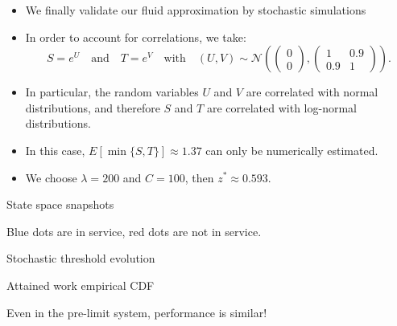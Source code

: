 \documentclass[aspectratio=169]{beamer}
\begin{document}
\begin{frame}
	\begin{itemize}
	\item We finally validate our fluid approximation by stochastic simulations
	\item In order to account for correlations, we take:
	 \begin{equation*}
    S = e^U \quad \text{and} \quad T = e^V \quad \text{with} \quad (U, V) \sim \mathcal{N}\left(\begin{pmatrix}
    0 \\ 0
    \end{pmatrix}, \begin{pmatrix}
    1 & 0.9 \\ 0.9 & 1
    \end{pmatrix}\right).
\end{equation*}
    \item In particular, the random variables $U$ and $V$ are correlated with normal distributions, and therefore $S$ and $T$ are correlated with log-normal distributions.
	\item In this case, $E[\min\{S,T\}] \approx 1.37$ can only be numerically estimated. 
	\item We choose $\lambda = 200$ and $C=100$, then $z^* \approx 0.593$.
	\end{itemize}
	

\end{frame}

\begin{frame}{State space snapshots}
    
	\begin{center}
	
    
    
    \end{center}

	\vfill
	Blue dots are in service, red dots are not in service. 
\end{frame}

\begin{frame}{Stochastic threshold evolution}
	\begin{center}
	
    
        
	\end{center}

\end{frame}

\begin{frame}{Attained work empirical CDF}

	\begin{center}
    
    \end{center}
    
	\vfill

	Even in the pre-limit system, performance is similar!
\end{frame}
\end{document}
